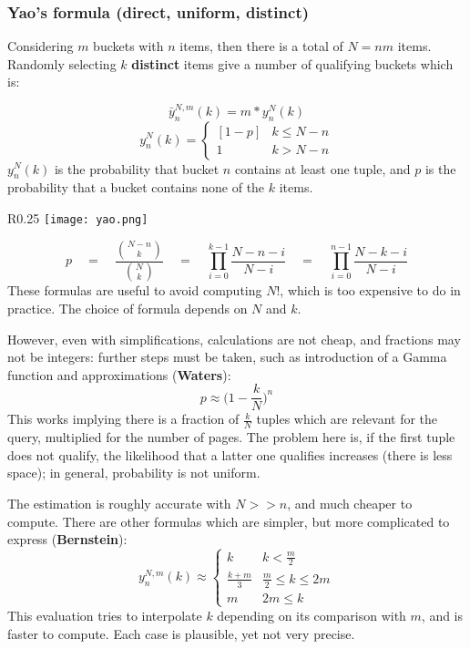 \subsubsection{Yao's formula (direct, uniform, distinct)}
Considering $m$ buckets with $n$ items, then there is a total of $N = nm$ items. Randomly selecting $k$ \textbf{distinct} items give a number of qualifying buckets which is:

$$\bar{y}^{N, m}_n(k) = m * y^N_n(k)$$
$$y^N_n(k) = \begin{cases}
	[1 - p] & k \leq N - n \\
	1 & k > N - n
\end{cases}$$
$y^N_n(k)$ is the probability that bucket $n$ contains at least one tuple, and $p$ is the probability that a bucket contains none of the $k$ items.
\begin{wrapfigure}{R}{0.25\textwidth}
	\vspace{-25pt}
	\texttt{[image: yao.png]}
	\vspace{-30pt}
\end{wrapfigure}
$$p \quad = \quad \frac{{{N-n}\choose{k}}}{{{N}\choose{k}}} \quad = \quad \prod_{i=0}^{k-1} \frac{N-n-i}{N-i} \quad = \quad \prod_{i=0}^{n-1}\frac{N-k-i}{N-i}$$
These formulas are useful to avoid computing $N!$, which is too expensive to do in practice. The choice of formula depends on $N$ and $k$.

However, even with simplifications, calculations are not cheap, and fractions may not be integers: further steps must be taken, such as introduction of a Gamma function and approximations (\textbf{Waters}):
$$p \approx \Big( 1 - \frac{k}{N} \Big)^n$$
This works implying there is a fraction of $\frac{k}{N}$ tuples which are relevant for the query, multiplied for the number of pages. The problem here is, if the first tuple does not qualify, the likelihood that a latter one qualifies increases (there is less space); in general, probability is not uniform.

The estimation is roughly accurate with $N >> n$, and much cheaper to compute. There are other formulas which are simpler, but more complicated to express (\textbf{Bernstein}):
$$y_n^{N,m}(k) \approx \begin{cases}
	k & k < \frac{m}{2} \\
	\frac{k+m}{3} & \frac{m}{2} \leq k \leq 2m \\
	m & 2m \leq k
\end{cases}$$
This evaluation tries to interpolate $k$ depending on its comparison with $m$, and is faster to compute. Each case is plausible, yet not very precise. 

